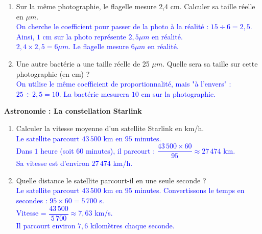 \documentclass[a4paper]{book}
\begin{document}
{\begin{exercice}
\begin{enumerate}
            \item Sur la même photographie, le flagelle mesure 2,4 cm. Calculer sa taille réelle en $\mu m$. \\
            \textcolor{blue}{On cherche le coefficient pour passer de la photo à la réalité : $15 \div 6 = 2,5$. \\ Ainsi, $1$ cm sur la photo représente $2,5 \mu m$ en réalité. \\ $2,4 \times 2,5 = 6 \mu m$. Le flagelle mesure $6 \mu m$ en réalité.}

\newpage
            
            \item Une autre bactérie a une taille réelle de 25 $\mu m$. Quelle sera sa taille sur cette photographie (en cm) ? \\
            \textcolor{blue}{On utilise le même coefficient de proportionnalité, mais "à l'envers" : \\ $25 \div 2,5 = 10$. La bactérie mesurera $10$ cm sur la photographie.}
        \end{enumerate}
    \end{exercice}

    \vspace{0.5cm}

    \begin{exercice}
        \textbf{Astronomie : La constellation Starlink} 
    
        \begin{enumerate}
            \item Calculer la vitesse moyenne d'un satellite Starlink en km/h. \\
            \textcolor{blue}{Le satellite parcourt $43\,500$ km en $95$ minutes. \\ Dans $1$ heure (soit $60$ minutes), il parcourt : $\dfrac{43\,500 \times 60}{95} \approx 27\,474$ km. \\ Sa vitesse est d'environ $27\,474$ km/h.}
            
            \item Quelle distance le satellite parcourt-il en une seule seconde ? \\
            \textcolor{blue}{Le satellite parcourt $43\,500$ km en $95$ minutes. Convertissons le temps en secondes : $95 \times 60 = 5\,700$ s. \\ Vitesse = $\dfrac{43\,500}{5\,700} \approx 7,63$ km/s. \\ Il parcourt environ $7,6$ kilomètres chaque seconde.}
            

\end{enumerate}
\end{exercice}}
\end{document}
